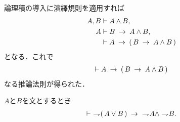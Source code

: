 	論理積の導入に演繹規則を適用すれば
	\begin{align}
		A,B &\vdash A \wedge B, \\
		A &\vdash B \rarrow A \wedge B, \\
		&\vdash A \rarrow (\, B \rarrow A \wedge B\, )
	\end{align}
	となる．これで
	\begin{align}
		\vdash A \rarrow (\, B \rarrow A \wedge B\, )
	\end{align}
	なる推論法則が得られた．
	
	\begin{screen}
		\begin{logicalthm}
		\label{logicalthm:weak_De_Morgan_law_2}
			$A$と$B$を文とするとき
			\begin{align}
				\vdash\ \negation (\, A \vee B\, ) 
				\rarrow\ \negation A \wedge \negation B.
			\end{align}
		\end{logicalthm}
	\end{screen}
	
